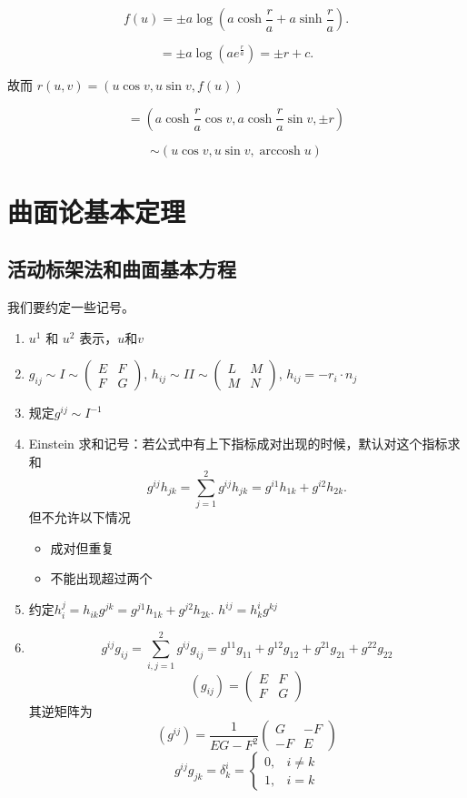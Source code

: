 \documentclass[lang=cn,10pt,thmcnt=section]{elegantbook}
\begin{document}
\[
f(u) = \pm a \log \left( a \cosh \frac{r}{a} + a \sinh \frac{r}{a} \right).
\]

\[
= \pm a \log \left( a e^{\frac{r}{a}} \right) = \pm r + c.
\]

故而 $r(u, v) = (u \cos v, u \sin v, f(u))$

\[
= \left( a \cosh \frac{r}{a} \cos v, a \cosh \frac{r}{a} \sin v, \pm r \right)
\]

\[
\sim (u \cos v, u \sin v, \operatorname{arccosh} u)
\]
\chapter{曲面论基本定理}
\section{活动标架法和曲面基本方程}
我们要约定一些记号。
\begin{enumerate}
    \item $u^1$ 和 $u^2$ 表示，$u \text{和}v$
    \item $g_{ij} \sim I \sim \begin{pmatrix} E & F \\ F & G \end{pmatrix}$, \quad $h_{ij} \sim II \sim \begin{pmatrix} L & M \\ M & N \end{pmatrix}$, \quad $h_{ij} = -r_i \cdot n_j$
    \item 规定$g^{ij}\sim I^{-1}$
    \item Einstein 求和记号：若公式中有上下指标成对出现的时候，默认对这个指标求和
    \[
    g^{ij}h_{jk}=\sum_{j=1}^{2} g^{ij} h_{jk} = g^{i1} h_{1k} + g^{i2} h_{2k}.
    \]但不允许以下情况
    \begin{itemize}
        \item 成对但重复
        \item 不能出现超过两个
    \end{itemize}
    \item  约定$h_i^j=  h_{ik}g^{jk}  = g^{j1} h_{1k} + g^{j2} h_{2k}$. \quad $h^{ij} = h_k^i g^{kj}$
    \item
    \[
    g^{ij} g_{ij} = \sum_{i,j=1}^{2} g^{ij} g_{ij} = g^{11} g_{11} + g^{12} g_{12} + g^{21} g_{21} + g^{22} g_{22}
    \]
    \[
	(g_{ij}) = \begin{pmatrix}
	E & F \\
	F & G
	\end{pmatrix}
	\]
	其逆矩阵为
	\[
	(g^{ij}) = \frac{1}{EG - F^2}
	\begin{pmatrix}
	G & -F \\
	-F & E
	\end{pmatrix}
	\]
    \[
    g^{ij} g_{jk} = \delta_k^i = \begin{cases} 0, & i \neq k \\ 1, & i = k \end{cases}
    \]
\end{enumerate}
\end{document}
